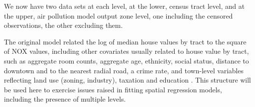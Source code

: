 \documentclass[]{book}
\newenvironment{Shaded}{\begin{snugshade}}{\end{snugshade}}
\newcommand{\DataTypeTok}[1]{\textcolor[rgb]{0.13,0.29,0.53}{#1}}
\newcommand{\DecValTok}[1]{\textcolor[rgb]{0.00,0.00,0.81}{#1}}
\newcommand{\KeywordTok}[1]{\textcolor[rgb]{0.13,0.29,0.53}{\textbf{#1}}}
\newcommand{\NormalTok}[1]{#1}
\newcommand{\OperatorTok}[1]{\textcolor[rgb]{0.81,0.36,0.00}{\textbf{#1}}}
\newcommand{\StringTok}[1]{\textcolor[rgb]{0.31,0.60,0.02}{#1}}
\begin{document}
We now have two data sets at each level, at the lower, census tract level, and at the upper, air pollution model output zone level, one including the censored observations, the other excluding them.

\begin{Shaded}
\end{Shaded}

The original model related the log of median house values by tract to the square of NOX values, including other covariates usually related to house value by tract, such as aggregate room counts, aggregate age, ethnicity, social status, distance to downtown and to the nearest radial road, a crime rate, and town-level variables reflecting land use (zoning, industry), taxation and education \citep{bivand17}. This structure will be used here to exercise issues raised in fitting spatial regression models, including the presence of multiple levels.
\end{document}
